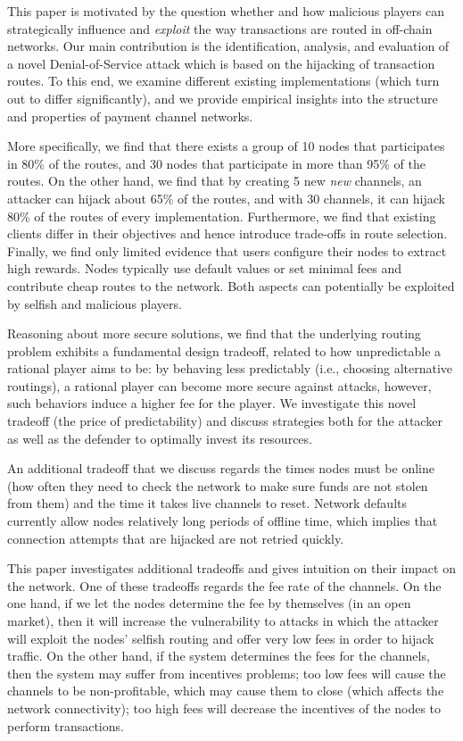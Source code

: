 This paper is motivated by the question whether and how malicious players
can strategically influence and \emph{exploit} the way transactions are routed
in off-chain networks. 
Our main contribution is the identification, analysis, and evaluation of a novel
Denial-of-Service attack which is based on the
hijacking of transaction routes. To this end,
we examine different existing
implementations (which turn out to differ significantly),
and we provide empirical insights into the structure and properties
of payment channel networks. 

More specifically, we find that there exists a group of 10 nodes that participates in 80\% of the routes, and 30 nodes that participate in more than 95\% of the routes. On the other hand, we find that by creating 5 new \emph{new} channels, an attacker can hijack about 65\% of the routes, and with 30 channels, it can hijack 80\% of the routes of every implementation.
Furthermore, we find that existing clients differ in their
objectives and hence introduce trade-offs in route selection. Finally, we find only 
limited evidence that users configure their nodes to extract high rewards. Nodes typically use default values or set minimal fees and contribute cheap routes to the network.
Both aspects can potentially be exploited by selfish and malicious
players. 

Reasoning about more secure solutions, we find that the underlying
routing problem exhibits a fundamental design tradeoff, related to how
unpredictable a rational player aims to be:
by behaving less predictably (i.e., choosing alternative routings), 
a rational player can become more secure
against attacks, however, such behaviors induce a higher fee for the player. 
We investigate this novel tradeoff (the price of predictability) and discuss strategies both for
the attacker as well as the defender to optimally invest its resources. 

An additional tradeoff that we discuss 
regards the times nodes must be online 
(how often they need to check the network to make sure funds are not stolen from them) 
and the time it takes live channels to reset. Network defaults currently allow nodes relatively long periods of
offline time, which implies that connection attempts that are hijacked are not retried quickly. 

This paper investigates additional tradeoffs and gives intuition on their impact on the network. One of these tradeoffs regards the fee rate of the channels. On the one hand, if we  let the nodes determine the fee by themselves (in an open market), then it will increase the vulnerability to attacks in which the attacker will exploit the nodes' selfish routing and offer very low fees in order to hijack traffic. On the other hand, if the system  determines the fees for the channels, then the system may suffer from incentives problems; too low fees will cause the channels to be non-profitable, which may cause them to close (which affects the network connectivity); too high fees will decrease the incentives of the nodes to perform transactions.

